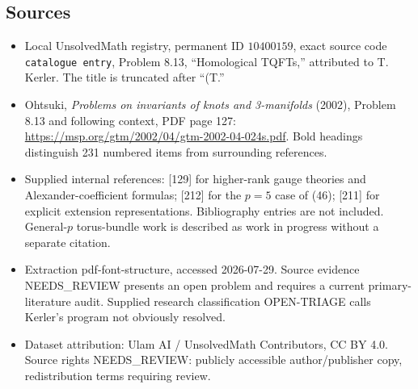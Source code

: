 \documentclass[11pt]{article}
\begin{document}
\subsection{Sources}
\begin{itemize}
\item Local UnsolvedMath registry, permanent ID \(10400159\), exact source code \texttt{catalogue entry}, Problem 8.13, ``Homological TQFTs,'' attributed to T. Kerler. The title is truncated after ``(T.''
\item Ohtsuki, \emph{Problems on invariants of knots and 3-manifolds} (2002), Problem 8.13 and following context, PDF page 127: \url{https://msp.org/gtm/2002/04/gtm-2002-04-024s.pdf}. Bold headings distinguish 231 numbered items from surrounding references.
\item Supplied internal references: [129] for higher-rank gauge theories and Alexander-coefficient formulas; [212] for the \(p=5\) case of (46); [211] for explicit extension representations. Bibliography entries are not included. General-\(p\) torus-bundle work is described as work in progress without a separate citation.
\item Extraction pdf-font-structure, accessed 2026-07-29. Source evidence NEEDS\_REVIEW presents an open problem and requires a current primary-literature audit. Supplied research classification OPEN-TRIAGE calls Kerler's program not obviously resolved.
\item Dataset attribution: Ulam AI / UnsolvedMath Contributors, CC BY 4.0. Source rights NEEDS\_REVIEW: publicly accessible author/publisher copy, redistribution terms requiring review.
\end{itemize}
\end{document}
